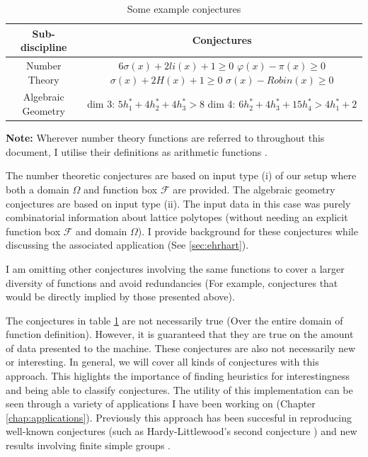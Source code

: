 \begin{table}[ht]
        \caption{Some example conjectures}
        \vspace{0.5cm} %
        \centering
        \begin{tabular}{|c|c|}
            \hline
            \textbf{Sub-discipline} & \textbf{Conjectures} \\
            \hline
            Number Theory & \makecell{$6\sigma(x) + 2li(x) + 1 \geq 0$ \\ $\varphi(x) - \pi(x) \geq 0$ \\ $\sigma(x) + 2H(x) + 1 \geq 0$ \\ $\sigma(x) - Robin(x)\geq 0$} \\
            \hline
            Algebraic Geometry & \makecell{dim 3: $5h^*_1 + 4h^*_2 + 4h^*_3 > 8$ \\ dim 4: $6h^*_2 + 4h^*_3 + 15h^*_4 > 4h^*_1 + 2$}\\
            \hline
        \end{tabular}
        \label{table:conjectures}    
    \end{table}

\textbf{Note:} Wherever number theory functions are referred to throughout this document, I utilise their definitions as arithmetic functions \cite{Apostol_1976}.
\par The number theoretic conjectures are based on input type (i) of our setup where both a domain $\Omega$ and function box $\mathcal{F}$ are provided.
The algebraic geometry conjectures are based on input type (ii). The input data in this case was purely combinatorial information about lattice polytopes (without needing an explicit function box $\mathcal{F}$ and domain $\Omega$). I provide background for these conjectures while discussing the associated application (See \ref{sec:ehrhart}).

I am omitting other conjectures involving the same functions to cover a larger diversity of functions and avoid redundancies (For example, conjectures that would be directly implied by those presented above). 

\begin{remark}
    The conjectures in table \ref{table:conjectures} are not necessarily true (Over the entire domain of function definition). However, it is guaranteed that they are true on the amount of data presented to the machine. These conjectures are also not necessarily new or interesting. In general, we will cover all kinds of conjectures with this approach. This higlights the importance of
    finding heuristics for interestingness and being able to classify conjectures. The utility of this implementation can be seen through a variety of applications I have been working on (Chapter \ref{chap:applications}). Previously this approach has been succesful in reproducing well-known conjectures (such as Hardy-Littlewood's second conjecture \cite{mishraConjGen2023}) and new results involving finite simple groups \cite{heLearningBeSimple2023}.
\end{remark}

